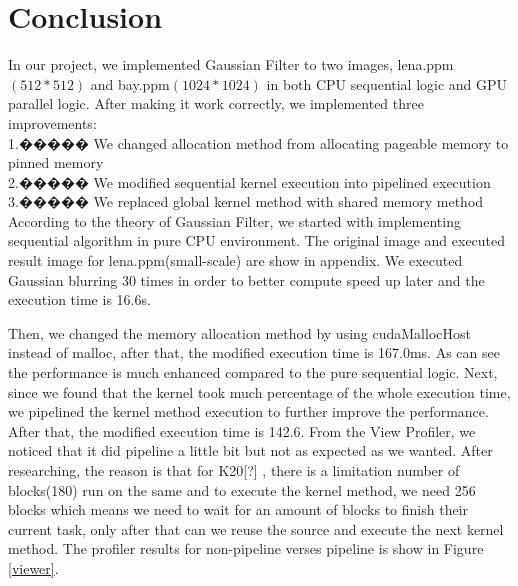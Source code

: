 \documentclass[journal,11pt,onecolumn,draftclsnofoot]{ieeeconf}  %
\begin{document}
\section{Conclusion} 
In our project, we implemented Gaussian Filter to two images, lena.ppm$(512*512)$ and bay.ppm$(1024*1024)$ in both CPU sequential logic and GPU parallel logic. After making it work correctly, we implemented three improvements:  \\
1.����� We changed allocation method from allocating pageable memory to pinned memory \\
2.����� We modified sequential kernel execution into pipelined execution \\
3.����� We replaced global kernel method with shared memory method \\

According to the theory of Gaussian Filter, we started with implementing sequential algorithm in pure CPU environment. The original image and executed result image for lena.ppm(small-scale) are show in appendix. We executed Gaussian blurring 30 times in order to better compute speed up later and the execution time is 16.6s.

Then, we changed the memory allocation method by using cudaMallocHost instead of malloc, after that, the modified execution time is 167.0ms. As can see the performance is much enhanced compared to the pure sequential logic.
Next, since we found that the kernel took much percentage of the whole execution time, we pipelined the kernel method execution to further improve the performance. After that, the modified execution time is 142.6. From the View Profiler, we noticed that it did pipeline a little bit but not as expected as we wanted. After researching, the reason is that for K20[?] , there is a limitation number of blocks(180) run on the same and to execute the kernel method, we need 256 blocks which means we need to wait for an amount of blocks to finish their current task, only after that can we reuse the source and execute the next kernel method. The profiler results for non-pipeline verses pipeline is show in Figure \ref{viewer}.
\end{document}
